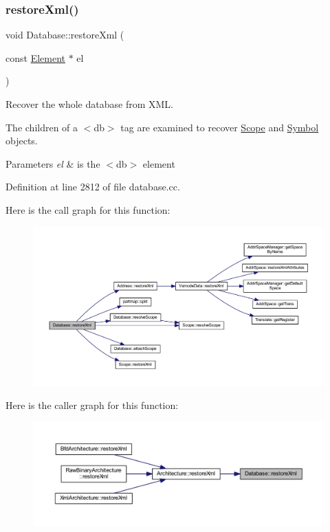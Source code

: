 \subsubsection{\texorpdfstring{restoreXml()}{restoreXml()}}
{\footnotesize\ttfamily void Database\+::restore\+Xml (\begin{DoxyParamCaption}\item[{const \mbox{\hyperlink{class_element}{Element}} $\ast$}]{el }\end{DoxyParamCaption})}



Recover the whole database from X\+ML. 

The children of a $<$db$>$ tag are examined to recover \mbox{\hyperlink{class_scope}{Scope}} and \mbox{\hyperlink{class_symbol}{Symbol}} objects. 
\begin{DoxyParams}{Parameters}
{\em el} & is the $<$db$>$ element \\
\hline
\end{DoxyParams}


Definition at line 2812 of file database.\+cc.

Here is the call graph for this function\+:
\nopagebreak
\begin{figure}[H]
\begin{center}
\leavevmode
\includegraphics[width=350pt]{class_database_ad216578696aaa7c956be9cfe752edf57_cgraph}
\end{center}
\end{figure}
Here is the caller graph for this function\+:
\nopagebreak
\begin{figure}[H]
\begin{center}
\leavevmode
\includegraphics[width=350pt]{class_database_ad216578696aaa7c956be9cfe752edf57_icgraph}
\end{center}
\end{figure}
\mbox{\label{class_database_a2ced34f8773df5ae0df973a6f84c1495}} 
